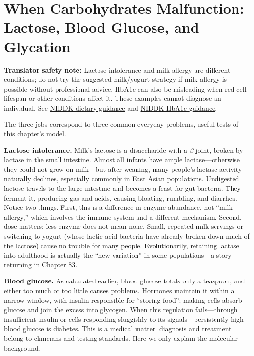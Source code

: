 \section{When Carbohydrates Malfunction: Lactose, Blood Glucose, and Glycation}

\textbf{Translator safety note:} Lactose intolerance and milk allergy are different conditions; do not try the suggested milk/yogurt strategy if milk allergy is possible without professional advice. HbA1c can also be misleading when red-cell lifespan or other conditions affect it. These examples cannot diagnose an individual. See \href{https://www.niddk.nih.gov/health-information/digestive-diseases/lactose-intolerance/eating-diet-nutrition}{NIDDK dietary guidance} and \href{https://www.niddk.nih.gov/health-information/diagnostic-tests/a1c-test}{NIDDK HbA1c guidance}.

The three jobs correspond to three common everyday problems, useful tests of this chapter's model.

\textbf{Lactose intolerance.} Milk's lactose is a disaccharide with a $\beta$ joint, broken by lactase in the small intestine. Almost all infants have ample lactase---otherwise they could not grow on milk---but after weaning, many people's lactase activity naturally declines, especially commonly in East Asian populations. Undigested lactose travels to the large intestine and becomes a feast for gut bacteria. They ferment it, producing gas and acids, causing bloating, rumbling, and diarrhea. Notice two things. First, this is a difference in enzyme abundance, not ``milk allergy,'' which involves the immune system and a different mechanism. Second, dose matters: less enzyme does not mean none. Small, repeated milk servings or switching to yogurt (whose lactic-acid bacteria have already broken down much of the lactose) cause no trouble for many people. Evolutionarily, retaining lactase into adulthood is actually the ``new variation'' in some populations---a story returning in Chapter 83.

\textbf{Blood glucose.} As calculated earlier, blood glucose totals only a teaspoon, and either too much or too little causes problems. Hormones maintain it within a narrow window, with insulin responsible for ``storing food'': making cells absorb glucose and join the excess into glycogen. When this regulation fails---through insufficient insulin or cells responding sluggishly to its signals---persistently high blood glucose is diabetes. This is a medical matter: diagnosis and treatment belong to clinicians and testing standards. Here we only explain the molecular background.

